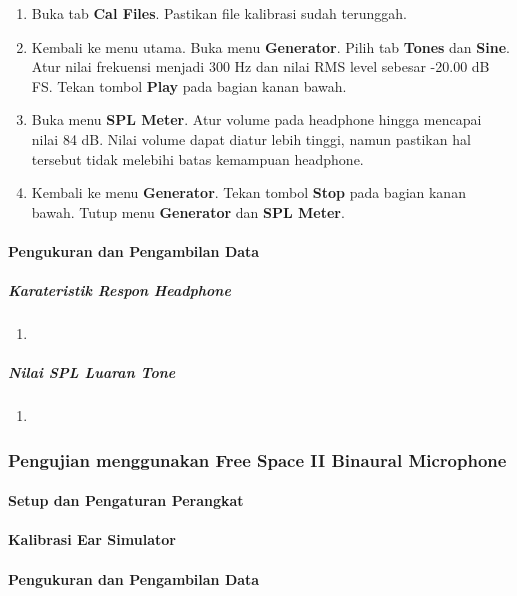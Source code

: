 \documentclass{article}
\begin{document}
\begin{enumerate}
		\item Buka tab {\bf Cal Files}. Pastikan file kalibrasi sudah terunggah.
		
		\item Kembali ke menu utama. Buka menu {\bf Generator}. Pilih tab {\bf Tones} dan {\bf Sine}. Atur nilai frekuensi menjadi 300 Hz dan nilai RMS level sebesar -20.00 dB FS. Tekan tombol {\bf Play} pada bagian kanan bawah.
		
		\item Buka menu {\bf SPL Meter}. Atur volume pada headphone hingga mencapai nilai 84 dB. Nilai volume dapat diatur lebih tinggi, namun pastikan hal tersebut tidak melebihi batas kemampuan headphone.
		
		\item Kembali ke menu {\bf Generator}. Tekan tombol {\bf Stop} pada bagian kanan bawah. Tutup menu {\bf Generator} dan {\bf SPL Meter}. 
		
	\end{enumerate}
	
	\paragraph{Pengukuran dan Pengambilan Data}
	\subparagraph{Karateristik Respon Headphone}
	\begin{enumerate}
		\item 
	\end{enumerate}
	
	\subparagraph{Nilai SPL Luaran Tone}
	\begin{enumerate}
		\item 
	\end{enumerate}

	\subsubsection{Pengujian menggunakan Free Space II Binaural Microphone}
	\paragraph{Setup dan Pengaturan Perangkat}
	
	\paragraph{Kalibrasi Ear Simulator}
	
	\paragraph{Pengukuran dan Pengambilan Data}	
	
	
\end{document}
